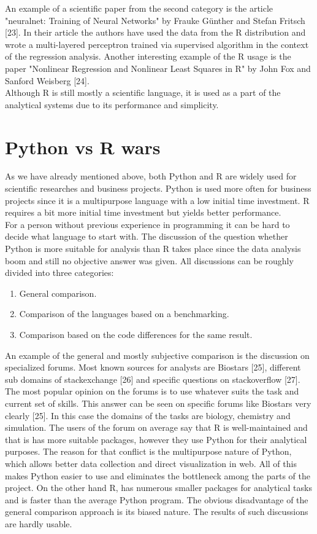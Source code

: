 \documentclass[
  twoside,
  11pt, a4paper,
  footinclude=true,
  headinclude=true,
  cleardoublepage=empty
]{scrreprt}
\begin{document}
        An example of a scientific paper from the second category is the article "neuralnet: Training of Neural Networks" by Frauke Günther and Stefan Fritsch [23]. In their article the authors have used the data from the R distribution and wrote a multi-layered perceptron trained via supervised algorithm in the context of the regression analysis. Another interesting example of the R usage is the paper "Nonlinear Regression and Nonlinear Least Squares in R" by John Fox and Sanford Weisberg [24].\\
        Although R is still mostly a scientific language, it is used as a part of the analytical systems due to its performance and simplicity.
        
        \section{Python vs R wars}
        As we have already mentioned above, both Python and R are widely used for scientific researches and business projects. Python is used more often for business projects since it is a multipurpose language with a low initial time investment. R requires a bit more initial time investment but yields better performance.\\
        For a person without previous experience in programming it can be hard to decide what language to start with. The discussion of the question whether Python is more suitable for analysis than R takes place since the data analysis boom and still no objective answer was given. All discussions can be roughly divided into three categories:
        \begin{enumerate}
            \item General comparison.
            \item Comparison of the languages based on a benchmarking.
            \item Comparison based on the code differences for the same result.
        \end{enumerate}
        An example of the general and mostly subjective comparison is the discussion on specialized forums. Most known sources for analysts are Biostars [25], different sub domains of stackexchange [26] and specific questions on stackoverflow [27]. The most popular opinion on the forums is to use whatever suits the task and current set of skills. This answer can be seen on specific forums like Biostars very clearly [25]. In this case the domains of the tasks are biology, chemistry and simulation. The users of the forum on average say that R is well-maintained and that is has more suitable packages, however they use Python for their analytical purposes. The reason for that conflict is the multipurpose nature of Python, which allows better data collection and direct visualization in web. All of this makes Python easier to use and eliminates the bottleneck among the parts of the project. On the other hand R, has numerous smaller packages for analytical tasks and is faster than the average Python program. The obvious disadvantage of the general comparison approach is its biased nature. The results of such discussions are hardly usable.\\
\end{document}
